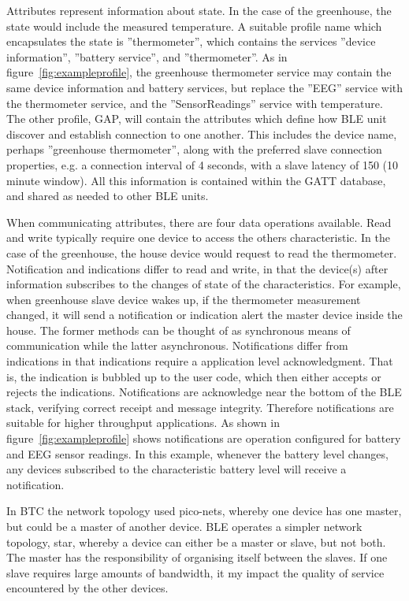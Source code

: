 \documentclass[]{article}
\begin{document}
 Attributes represent information about state. In the case of the greenhouse, the state would include the measured temperature. A suitable profile name which encapsulates the state is ''thermometer'', which contains the services ''device information'', ''battery service'', and ''thermometer''. As in figure~\ref{fig:exampleprofile}, the greenhouse thermometer service may contain the same device information and battery services, but replace the ''EEG'' service with the thermometer service, and the ''SensorReadings'' service with temperature. The other profile, \ac{GAP}, will contain the attributes which define how \ac{BLE} unit discover and establish connection to one another.  This includes the device name, perhaps ''greenhouse thermometer'', along with the preferred slave connection properties, e.g. a connection interval of 4 seconds, with a slave latency of 150 (10 minute window). All this information is contained within the GATT database, and shared as needed to other \ac{BLE} units. 

When communicating attributes, there are four data operations available. Read and write typically require one device to access the others characteristic. In the case of the greenhouse, the house device would request to read the thermometer. Notification and indications differ to read and write, in that the device(s) after information subscribes to the changes of state of the characteristics. For example, when greenhouse slave device wakes up, if the thermometer measurement changed, it will send a notification or indication alert the master device inside the house. The former methods can be thought of as synchronous means of communication while the latter asynchronous. Notifications differ from indications in that indications require a application level acknowledgment. That is, the indication is bubbled up to the user code, which then either accepts or rejects the indications. Notifications are acknowledge near the bottom of the \ac{BLE} stack, verifying correct receipt and message integrity. Therefore notifications are suitable for higher throughput applications. As shown in figure~\ref{fig:exampleprofile} shows notifications are operation configured for battery and EEG sensor readings. In this example, whenever the battery level changes, any devices subscribed to the characteristic battery level will receive a notification.

In \ac{BTC} the network topology used pico-nets, whereby one device has one master, but could be a master of another device. \ac{BLE} operates a simpler network topology, star, whereby a device can either be a master or slave, but not both. The master has the responsibility of organising itself between the slaves. If one slave requires large amounts of bandwidth, it my impact the quality of service encountered by the other devices. 
\end{document}
